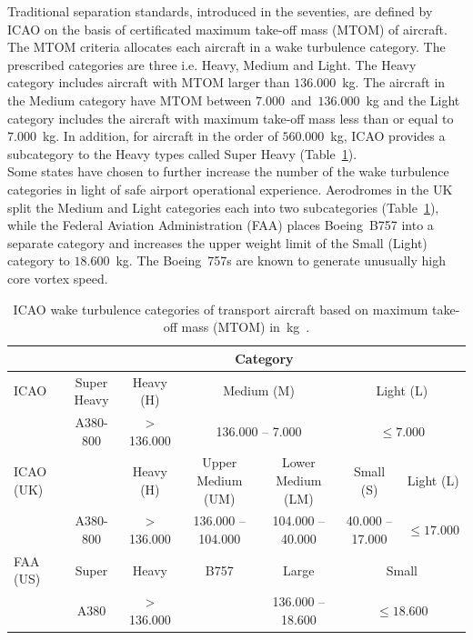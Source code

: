 Traditional separation standards, introduced in the seventies, are defined by ICAO on the basis of certificated maximum take-off mass (MTOM) of aircraft. The MTOM criteria allocates each aircraft in a wake turbulence category. The prescribed categories are three i.e. Heavy, Medium and Light.
The Heavy category includes aircraft with MTOM larger than $136.000$~kg. The aircraft in the Medium category have MTOM between $7.000$~and~$136.000$~kg and the Light category includes the aircraft with maximum take-off mass less than or equal to $7.000$~kg.
In addition, for aircraft in the order of $560.000$~kg, ICAO provides a subcategory to the Heavy types called Super Heavy (Table~\ref{tab:WTC}). \\
Some states have chosen to further increase the number of the wake turbulence categories in light of safe airport operational experience. Aerodromes in the UK split the Medium and Light categories each into two subcategories (Table~\ref{tab:WTC}), while the Federal Aviation Administration (FAA) places Boeing~B757 into a separate category and increases the upper weight limit of the Small (Light) category to $18.600$~kg. The Boeing~757s are known to generate unusually high core vortex speed.~\cite{icao_wtc, uk_aeronautical_information_services_wake_2017, noauthor_recat_2018}
\begin{table}[ht]
    \centering
    \resizebox{1\textwidth}{!} {
    \begin{tabular}{l|c|c|c|c|c|c}
    ~    & \multicolumn{6}{c}{Category} \\ \hline
    ICAO & Super Heavy & Heavy (H) & \multicolumn{2}{c|}{Medium (M)} & \multicolumn{2}{c}{Light (L)} \\
    
    ~    & A380-800    & > 136.000  & \multicolumn{2}{c|}{ 136.000 -- 7.000 } & \multicolumn{2}{c}{$ \leq 7.000$} \\ \hline
    
    ICAO (UK)   & ~  & Heavy (H) & Upper Medium (UM) & Lower Medium (LM) & Small (S)  & Light (L) \\
    
    ~    & A380-800    & > 136.000  & 136.000 -- 104.000     & 104.000 -- 40.000      & 40.000 -- 17.000 & $ \leq 17.000 $   \\ \hline
    
    FAA (US)   & Super      & Heavy & B757   & Large   & \multicolumn{2}{c}{Small} \\
    
    ~    & A380        &  > 136.000   & ~                 &  136.000 -- 18.600       & \multicolumn{2}{c}{$ \leq 18.600 $} \\ 
    \end{tabular}}
    \caption[ICAO wake turbulence categories based on maximum take-off mass]{ICAO wake turbulence categories of transport aircraft based on maximum take-off mass (MTOM) in~kg~\cite{doc4444full, uk_aeronautical_information_services_wake_2017, kolos2013influence}.} \label{tab:WTC}
\end{table}


